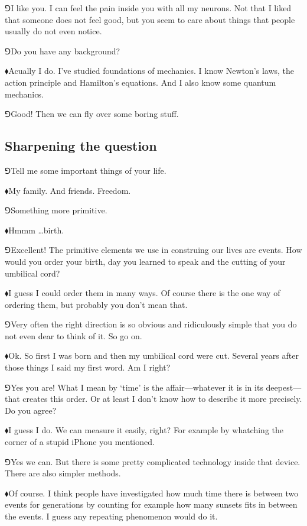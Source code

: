 \documentclass[10pt,oneside%
]{memoir}
\newcommand{\hea}{\(\blacklozenge\)\;}
\newcommand{\heb}{\(\Game\)\;}
\begin{document}
\heb I like you. I can feel the pain inside you with all my neurons. Not that I liked that someone does not feel good, but you seem to care about things that people usually do not even notice.

\heb Do you have any background?

\hea Acually I do. I've studied foundations of mechanics. I know Newton's laws, the action principle and Hamilton's equations. And I also know some quantum mechanics.

\heb Good! Then we can fly over some boring stuff.
\subsection{Sharpening the question}
\heb Tell me some important things of your life.

\hea My family. And friends. Freedom.

\heb Something more primitive.

\hea Hmmm \ldots birth.

\heb Excellent! The primitive elements we use in construing our lives are events. How would you order your birth, day you learned to speak and the cutting of your umbilical cord?

\hea I guess I could order them in many ways. Of course there is the one way of ordering them, but probably you don't mean that.

\heb Very often the right direction is so obvious and ridiculously simple that you do not even dear to think of it. So go on.

\hea Ok. So first I was born and then my umbilical cord were cut. Several years after those things I said my first word. Am I right?

\heb Yes you are! What I mean by `time' is the affair---whatever it is in its deepest---that creates this order. Or at least I don't know how to describe it more precisely. Do you agree?

\hea I guess I do. We can measure it easily, right? For example by whatching the corner of a stupid iPhone you mentioned.

\heb Yes we can. But there is some pretty complicated technology inside that device. There are also simpler methods.

\hea Of course. I think people have investigated how much time there is between two events for generations by counting for example how many sunsets fits in between the events. I guess any repeating phenomenon would do it.
\end{document}

